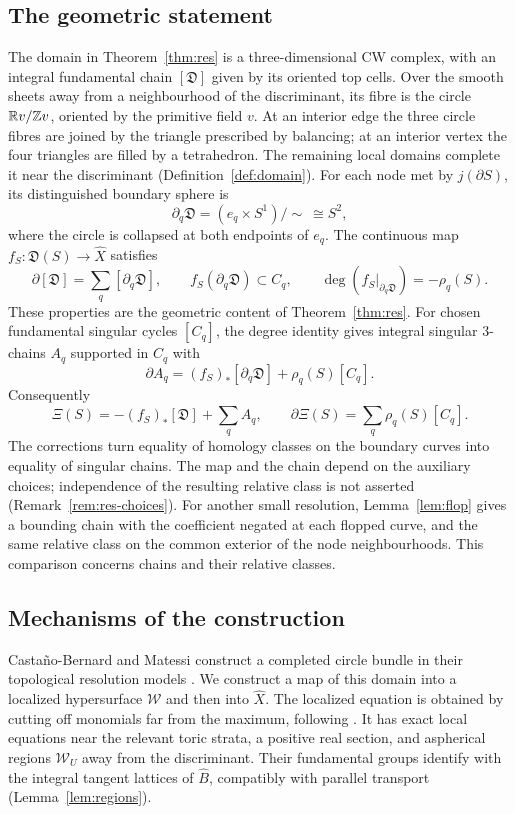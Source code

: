 \subsection{The geometric statement}\label{ssec:res-outline}
The domain in Theorem~\ref{thm:res} is a three-dimensional CW complex, with an integral fundamental chain
$[\mathfrak D]$ given by its oriented top cells. Over the smooth sheets away from a neighbourhood of the discriminant,
its fibre is the circle $\mathbb R v/\mathbb Z v$, oriented by the primitive field $v$. At an interior edge the three circle fibres
are joined by the triangle prescribed by balancing; at an interior vertex the four triangles are filled by a tetrahedron.
The remaining local domains complete it near the discriminant (Definition~\ref{def:domain}). For each node met by
$j(\partial S)$, its distinguished boundary sphere is
\[
\partial_q\mathfrak D=(e_q\times S^1)/\!\sim\ \cong S^2,
\]
where the circle is collapsed at both endpoints of $e_q$. The continuous map $f_S\colon\mathfrak D(S)\to\widehat X$
satisfies
\[
\partial[\mathfrak D]=\sum_q[\partial_q\mathfrak D],\qquad
f_S(\partial_q\mathfrak D)\subset C_q,\qquad
\deg(f_S|_{\partial_q\mathfrak D})=-\rho_q(S).
\]
These properties are the geometric content of Theorem~\ref{thm:res}. For chosen fundamental singular cycles $[C_q]$,
the degree identity gives integral singular $3$-chains $A_q$ supported in $C_q$ with
\[
\partial A_q=(f_S)_*[\partial_q\mathfrak D]+\rho_q(S)[C_q].
\]
Consequently
\[
\Xi(S)=-(f_S)_*[\mathfrak D]+\sum_q A_q,\qquad
\partial\Xi(S)=\sum_q\rho_q(S)[C_q].
\]
The corrections turn equality of homology classes on the boundary curves into equality of singular chains.
The map and the chain depend on the auxiliary choices; independence of the resulting relative class is not asserted
(Remark~\ref{rem:res-choices}). For another small resolution, Lemma~\ref{lem:flop} gives a bounding chain with the
coefficient negated at each flopped curve, and the same relative class on the common exterior of the node
neighbourhoods. This comparison concerns chains and their relative classes.

\subsection{Mechanisms of the construction}
Casta\~no-Bernard and Matessi construct a completed circle bundle in their topological resolution models
\cite[\S7.5, \S7.7]{CBM}. We construct a map of this domain into a localized hypersurface $\mathscr W$ and then into
$\widehat X$. The localized equation is obtained by cutting off monomials far from the maximum, following
\cite{Mikhalkin,Ya16}. It has exact local equations near the relevant toric strata, a positive real section, and
aspherical regions $\mathscr W_U$ away from the discriminant. Their fundamental groups identify with the integral
tangent lattices of $\widehat B$, compatibly with parallel transport (Lemma~\ref{lem:regions}).

